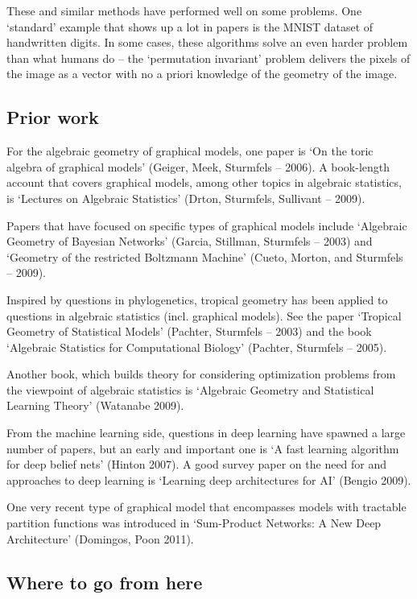 \documentclass[11pt]{article}
\begin{document}
These and similar methods have performed well on some problems.  One `standard'
example that shows up a lot in papers is the MNIST dataset of handwritten
digits.  In some cases, these algorithms solve an even harder problem than what
humans do -- the `permutation invariant' problem delivers the pixels of the
image as a vector with no a priori knowledge of the geometry of the image.

\subsection{Prior work}

For the algebraic geometry of graphical models, one paper is `On the toric
algebra of graphical models' (Geiger, Meek, Sturmfels -- 2006).  A book-length
account that covers graphical models, among other topics in algebraic
statistics, is `Lectures on Algebraic Statistics' (Drton, Sturmfels, Sullivant
-- 2009).  

Papers that have focused on specific types of graphical models include
`Algebraic Geometry of Bayesian Networks' (Garcia, Stillman, Sturmfels -- 2003)
and `Geometry of the restricted Boltzmann Machine' (Cueto, Morton, and Sturmfels
-- 2009).  

Inspired by questions in phylogenetics, tropical geometry has been applied to
questions in algebraic statistics (incl. graphical models).  See the paper
`Tropical Geometry of Statistical Models' (Pachter, Sturmfels -- 2003) and the
book `Algebraic Statistics for Computational Biology' (Pachter, Sturmfels --
2005).

Another book, which builds theory for considering optimization problems from the
viewpoint of algebraic statistics is `Algebraic Geometry and Statistical
Learning Theory' (Watanabe 2009).

From the machine learning side, questions in deep learning have spawned a large
number of papers, but an early and important one is `A fast learning algorithm for
deep belief nets' (Hinton 2007).  A good survey paper on the need for and
approaches to deep learning is `Learning deep architectures for AI' (Bengio
2009).

One very recent type of graphical model that encompasses models with tractable
partition functions was introduced in `Sum-Product Networks: A New Deep
Architecture' (Domingos, Poon 2011).

\subsection{Where to go from here}
\end{document}
